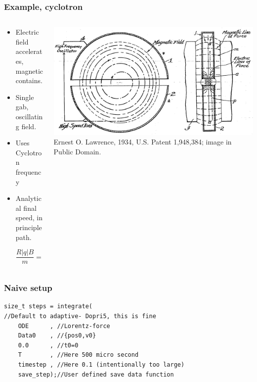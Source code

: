 \documentclass{beamer}
\begin{document}
\begin{frame}
\frametitle{Example, cyclotron}
\begin{columns}
\begin{column}{0.5\linewidth}
\begin{itemize}
\item<1-> Electric field accelerates, magnetic contains.

\item<2-> Single gab, oscillating field.

\item<3-> Uses Cyclotron frequency

\item<4-> Analytical final speed, in principle path.

\begin{equation*}
\frac{R|q|B}{m} = v_\perp
\end{equation*}

\end{itemize}
\end{column}
\begin{column}{0.5\linewidth}
\includegraphics[width=\linewidth]{ Cyclotron_patent.png}
{\color{gray} Ernest O. Lawrence, 1934, U.S. Patent 1,948,384; image in Public Domain.}
\end{column}
\end{columns}
\end{frame}


\begin{frame}[fragile]
\frametitle{Naive setup}
\begin{lstlisting}
size_t steps = integrate(
//Default to adaptive- Dopri5, this is fine
    ODE      , //Lorentz-force
    Data0    , //{pos0,v0}
    0.0      , //t0=0
    T        , //Here 500 micro second
    timestep , //Here 0.1 (intentionally too large)
    save_step);//User defined save data function
\end{lstlisting}
\end{frame}
\end{document}
